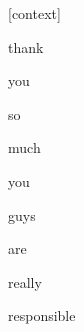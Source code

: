 \documentclass[varwidth]{standalone}
\begin{document}
\begin{CJK*}{UTF8}{gbsn}
{\setlength{\fboxsep}{0pt}\colorbox{white!0}{\parbox{0.9\textwidth}{
\colorbox{red!0.0003606333048082888}{\strut [context]} \colorbox{red!0.7029778957366943}{\strut thank} \colorbox{red!0.024328220635652542}{\strut you} \colorbox{red!0.002681572688743472}{\strut so} \colorbox{red!0.04639775678515434}{\strut much} \colorbox{red!0.006317513063549995}{\strut you} \colorbox{red!0.07415447384119034}{\strut guys} \colorbox{red!0.23767489194869995}{\strut are} \colorbox{red!0.85316002368927}{\strut really} \colorbox{red!98.05194854736328}{\strut responsible} 
}}}
\end{CJK*}
\end{document}
